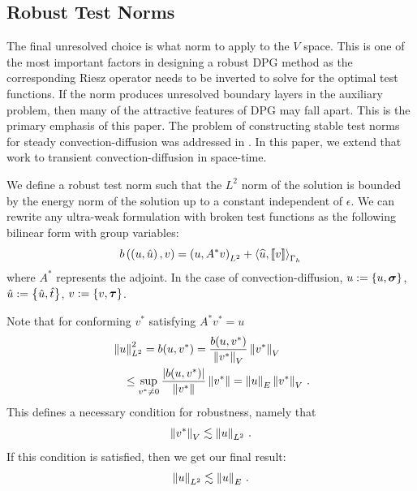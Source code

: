 \documentclass{article}
\begin{document}
\subsection{Robust Test Norms}
The final unresolved choice is what norm to apply to the $V$ space.
This is one of the most important factors in designing a robust DPG method as the corresponding Riesz operator 
needs to be inverted to solve for the optimal test functions.
If the norm produces unresolved boundary layers in the auxiliary problem, then many of the attractive features of DPG may fall apart.
This is the primary emphasis of this paper.
The problem of constructing stable test norms for steady convection-diffusion was addressed in \cite{DemkowiczHeuer,ChanHeuerThanhDemkowicz2012}.
In this paper, we extend that work to transient convection-diffusion in space-time.

We define a robust test norm such that the $L^2$ norm of the solution 
is bounded by the energy norm of the solution up to a constant independent of $\epsilon$.
We can rewrite any ultra-weak formulation with broken test functions as the following
bilinear form with group variables:
\[
b\left( \left( u,\hat u \right),v \right) = \left( u,A^* v \right)_{L^2} + \left\langle \widehat{u}, \left[ \![v]\! \right] \right\rangle_{\Gamma_h}
\]
where $A^*$ represents the adjoint.
In the case of convection-diffusion, $u:=\left\{ u,\boldsymbol\sigma \right\}$, $\hat u:=\left\{ \hat u,\hat t \right\}$, $v:=\left\{ v,\boldsymbol\tau \right\}$.

Note that for conforming $v^*$ satisfying $A^* v^* = u$
\begin{align*}
&\left\| u \right\|_{L^2}^2= b(u,v^*)
=\frac{b(u,v^*)}{\left\| v^* \right\|_V} \left\| v^* \right\|_V\\
&\quad\leq\sup_{v^*\neq0}\frac{|b(u,v^*)|}{\left\| v^* \right\|}\left\| v^* \right\|
=\left\| u \right\|_E \left\| v^* \right\|_V\,.
\end{align*}
This defines a necessary condition for robustness, namely that
\begin{align}
\label{eq:necessaryCondition}
\left\| v^* \right\|_V\lesssim\left\| u \right\|_{L^2}\,.
\end{align}
If this condition is satisfied, then we get our final result:
\begin{align*}
\left\| u \right\|_{L^2}\lesssim\left\| u \right\|_E\,.
\end{align*}
\end{document}
